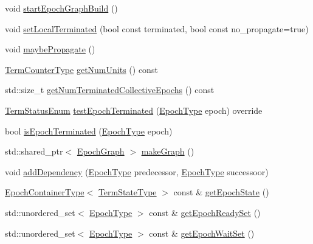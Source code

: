 \begin{DoxyCompactItemize}
\item 
void \hyperlink{structvt_1_1term_1_1_termination_detector_a782a54afd99943982ce455416828ea66}{start\+Epoch\+Graph\+Build} ()
\item 
void \hyperlink{structvt_1_1term_1_1_termination_detector_acb639c048af01c8d67c82db0227888a4}{set\+Local\+Terminated} (bool const terminated, bool const no\+\_\+propagate=true)
\item 
void \hyperlink{structvt_1_1term_1_1_termination_detector_a4a54157fff0152b531b26c4a18393049}{maybe\+Propagate} ()
\item 
\hyperlink{namespacevt_1_1term_a4fd378cdb0c36683afc1b3399d685f7f}{Term\+Counter\+Type} \hyperlink{structvt_1_1term_1_1_termination_detector_aa5802cb6f199f3359b1a85058102220c}{get\+Num\+Units} () const
\item 
std\+::size\+\_\+t \hyperlink{structvt_1_1term_1_1_termination_detector_af0b08c4a5dd17d893e677ad280bef84a}{get\+Num\+Terminated\+Collective\+Epochs} () const
\item 
\hyperlink{namespacevt_1_1term_ad8ec9b371608fc88e7fdeef219785b27}{Term\+Status\+Enum} \hyperlink{structvt_1_1term_1_1_termination_detector_a1d3cebd2600b5a3900dd9954de55cf35}{test\+Epoch\+Terminated} (\hyperlink{namespacevt_a985a5adf291c34a3ca263b3378388236}{Epoch\+Type} epoch) override
\item 
bool \hyperlink{structvt_1_1term_1_1_termination_detector_a2c85d1d5316235e068433f4a3984a67e}{is\+Epoch\+Terminated} (\hyperlink{namespacevt_a985a5adf291c34a3ca263b3378388236}{Epoch\+Type} epoch)
\item 
std\+::shared\+\_\+ptr$<$ \hyperlink{structvt_1_1term_1_1_termination_detector_af67f0ab522e54eb06d8ac541526155e3}{Epoch\+Graph} $>$ \hyperlink{structvt_1_1term_1_1_termination_detector_adb20ee8033c61f520d50592dd33b3080}{make\+Graph} ()
\item 
void \hyperlink{structvt_1_1term_1_1_termination_detector_a18685d6c5c81e5f1c73d92891cef601b}{add\+Dependency} (\hyperlink{namespacevt_a985a5adf291c34a3ca263b3378388236}{Epoch\+Type} predecessor, \hyperlink{namespacevt_a985a5adf291c34a3ca263b3378388236}{Epoch\+Type} successoor)
\item 
\hyperlink{structvt_1_1term_1_1_termination_detector_a69e2615b61e072977463eea5b20b7933}{Epoch\+Container\+Type}$<$ \hyperlink{structvt_1_1term_1_1_term_action_ae4c635b69751d887666814700ed64d65}{Term\+State\+Type} $>$ const  \& \hyperlink{structvt_1_1term_1_1_termination_detector_a185004af9f842c58258128456ef27160}{get\+Epoch\+State} ()
\item 
std\+::unordered\+\_\+set$<$ \hyperlink{namespacevt_a985a5adf291c34a3ca263b3378388236}{Epoch\+Type} $>$ const  \& \hyperlink{structvt_1_1term_1_1_termination_detector_a8eb6730fc343957d0a788919b641762e}{get\+Epoch\+Ready\+Set} ()
\item 
std\+::unordered\+\_\+set$<$ \hyperlink{namespacevt_a985a5adf291c34a3ca263b3378388236}{Epoch\+Type} $>$ const  \& \hyperlink{structvt_1_1term_1_1_termination_detector_aed77c0e79a681705e941314e7415df35}{get\+Epoch\+Wait\+Set} ()
\end{DoxyCompactItemize}
